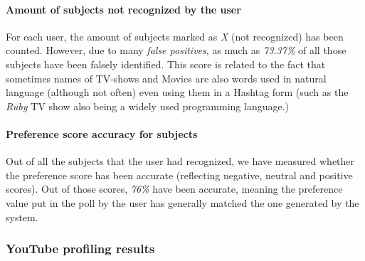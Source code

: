 \paragraph{Amount of subjects not recognized by the user}
For each user, the amount of subjects marked as \textit{X} (not recognized) has been counted. However, due to many
\textit{false positives}, as much as \textit{73.37\%} of all those subjects have been falsely identified. This score is
related to the fact that sometimes names of TV-shows and Movies are also words used in natural language (although not
often) even using them in a Hashtag form (such as the \textit{Ruby} TV show also being a widely used programming language.)

\paragraph{Preference score accuracy for subjects}
Out of all the subjects that the user had recognized, we have measured whether the preference score has been accurate
(reflecting negative, neutral and positive scores). Out of those scores, \textit{76\%} have been accurate, meaning
the preference value put in the poll by the user has generally matched the one generated by the system.

\subsubsection{YouTube profiling results}